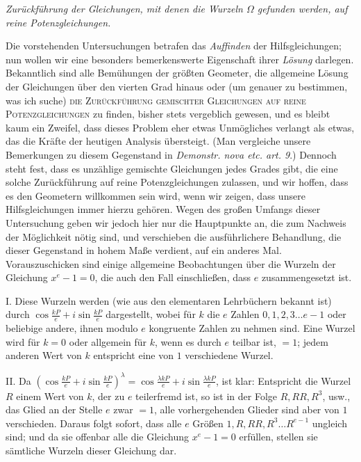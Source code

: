 \begin{center}\itshape \textit{Zurückführung der Gleichungen, mit denen die Wurzeln \(\Omega\) gefunden werden, auf reine Potenzgleichungen.}\end{center}


Die vorstehenden Untersuchungen betrafen das \textit{Auffinden} der Hilfsgleichungen; nun wollen wir eine besonders bemerkenswerte Eigenschaft ihrer \textit{Lösung} darlegen. Bekanntlich sind alle Bemühungen der größten Geometer, die allgemeine Lösung der Gleichungen über den vierten Grad hinaus oder (um genauer zu bestimmen, was ich suche) \textsc{die Zurückführung gemischter Gleichungen auf reine Potenzgleichungen} zu finden, bisher stets vergeblich gewesen, und es bleibt kaum ein Zweifel, dass dieses Problem eher etwas Unmögliches verlangt als etwas, das die Kräfte der heutigen Analysis übersteigt. (Man vergleiche unsere Bemerkungen zu diesem Gegenstand in \textit{Demonstr. nova etc. art. 9}.) Dennoch steht fest, dass es unzählige gemischte Gleichungen jedes Grades gibt, die eine solche Zurückführung auf reine Potenzgleichungen zulassen, und wir hoffen, dass es den Geometern willkommen sein wird, wenn wir zeigen, dass unsere Hilfsgleichungen immer hierzu gehören. Wegen des großen Umfangs dieser Untersuchung geben wir jedoch
hier nur die Hauptpunkte an, die zum Nachweis der Möglichkeit nötig sind, und verschieben die ausführlichere Behandlung, die dieser Gegenstand in hohem Maße verdient, auf ein anderes Mal. Vorauszuschicken sind einige allgemeine Beobachtungen über die Wurzeln der Gleichung \(x^e-1=0\), die auch den Fall einschließen, dass \(e\) zusammengesetzt ist.

I. Diese Wurzeln werden (wie aus den elementaren Lehrbüchern bekannt ist) durch \(\cos\frac{kP}e+i\sin\frac{kP}e\) dargestellt, wobei für \(k\) die \(e\) Zahlen \(0,\allowbreak 1,\allowbreak 2,\allowbreak 3\ldots e-1\) oder beliebige andere, ihnen modulo \(e\) kongruente Zahlen zu nehmen sind. Eine Wurzel wird für \(k=0\) oder allgemein für \(k\), wenn es durch \(e\) teilbar ist, \(=1\); jedem anderen Wert von \(k\) entspricht eine von \(1\) verschiedene Wurzel.

II. Da \((\cos\frac{kP}e+i\sin\frac{kP}e)^\lambda=\cos\frac{\lambda kP}e+i\sin\frac{\lambda kP}e\), ist klar: Entspricht die Wurzel \(R\) einem Wert von \(k\), der zu \(e\) teilerfremd ist, so ist in der Folge \(R,\allowbreak RR,\allowbreak R^3\), usw., das Glied an der Stelle \(e\) zwar \(=1\), alle vorhergehenden Glieder sind aber von \(1\) verschieden. Daraus folgt sofort, dass alle \(e\) Größen \(1,\allowbreak R,\allowbreak RR,\allowbreak R^3\ldots R^{e-1}\) ungleich sind; und da sie offenbar alle die Gleichung \(x^e-1=0\) erfüllen, stellen sie sämtliche Wurzeln dieser Gleichung dar.

